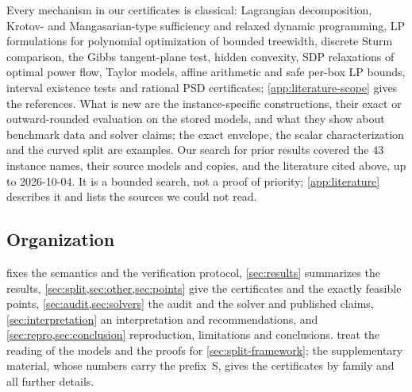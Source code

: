 Every mechanism in our certificates is classical: Lagrangian decomposition, Krotov- and Mangasarian-type sufficiency and relaxed dynamic programming, LP formulations for polynomial optimization of bounded treewidth, discrete Sturm comparison, the Gibbs tangent-plane test, hidden convexity, SDP relaxations of optimal power flow, Taylor models, affine arithmetic and safe per-box LP bounds, interval existence tests and rational PSD certificates; \cref{app:literature-scope} gives the references.
What is new are the instance-specific constructions, their exact or outward-rounded evaluation on the stored models, and what they show about benchmark data and solver claims; the exact  envelope, the scalar  characterization and the curved  split are examples.
Our search for prior results covered the 43 instance names, their source models and copies, and the literature cited above, up to 2026-10-04.
It is a bounded search, not a proof of priority; \cref{app:literature} describes it and lists the sources we could not read.

\subsection{Organization}\label{sec:intro-org}

 fixes the semantics and the verification protocol, \cref{sec:results} summarizes the results, \cref{sec:split,sec:other,sec:points} give the certificates and the exactly feasible points, \cref{sec:audit,sec:solvers} the audit and the solver and published claims, \cref{sec:interpretation} an interpretation and recommendations, and \cref{sec:repro,sec:conclusion} reproduction, limitations and conclusions.
 treat the reading of the models and the proofs for \cref{sec:split-framework}; the supplementary material, whose numbers carry the prefix~S, gives the certificates by family and all further details.
